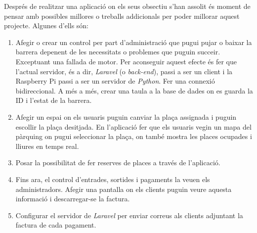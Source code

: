 Després de realitzar una aplicació on els seus obsectiu s'han assolit
és moment de pensar amb possibles millores o treballs addicionals
per poder millorar aquest projecte. Algunes d'ells són:

\begin{enumerate}
    \item Afegir o crear un control per part d'administració que pugui pujar o baixar
    la barrera depenent de les necessitats o problemes que puguin succeir. Exceptuant una
    fallada de motor. Per aconseguir aquest efecte és fer que l'actual servidor,
    és a dir, \emph{Laravel} (o \emph{back-end}), passi a ser un client i la Raspberry Pi passi a ser
    un servidor de \emph{Python}. Fer una connexió bidireccional.
    A més a més, crear una taula a la base de dades on es guarda la ID i l'estat de la barrera.
    \item Afegir un espai on els usuaris puguin canviar la plaça assignada i puguin
    escollir la plaça desitjada. En l'aplicació fer que els usuaris vegin un mapa
    del pàrquing on pugui seleccionar la plaça, on també mostra les places ocupades
    i lliures en temps real.
    \item Posar la possibilitat de fer reserves de places a través de l'aplicació.
    \item Fins ara, el control d'entrades, sortides i pagaments la veuen els administradors.
    Afegir una pantalla on els clients puguin veure aquesta informació i descarregar-se la factura.
    \item Configurar el servidor de \emph{Laravel} per enviar correus als clients adjuntant la factura
    de cada pagament.
\end{enumerate}
